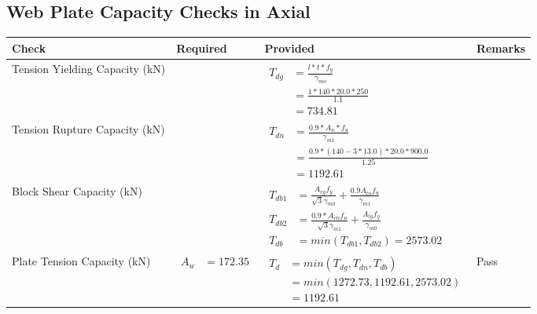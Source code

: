 \documentclass{article}%
\begin{document}
\subsection{Web Plate Capacity Checks in Axial}%
\label{subsec:WebPlateCapacityChecksinAxial}%
\renewcommand{\arraystretch}{1.2}%
\begin{longtable}{|p{4cm}|p{6cm}|p{5.5cm}|p{1.5cm}|}%
\hline%
\rowcolor{OsdagGreen}%
Check&Required&Provided&Remarks\\%
\hline%
\endhead%
\hline%
Tension Yielding Capacity (kN)&&$\begin{aligned} T_{dg} &= \frac{l*t*f_y}{\gamma_{mo}}\\ &=\frac{1*140*20.0*250}{1.1}\\ &=734.81\end{aligned}$&\\%
\hline%
Tension Rupture Capacity (kN)&&$\begin{aligned} T_{dn} &= \frac{0.9*A_{n}*f_u}{\gamma_{m1}}\\ &=\frac{0.9*(140-3*13.0)*20.0*900.0}{1.25}\\ &=1192.61\end{aligned}$&\\%
\hline%
Block Shear Capacity (kN)&&$\begin{aligned}T_{db1} &= \frac{A_{vg} f_{y}}{\sqrt{3} \gamma_{m0}} + \frac{0.9 A_{tn} f_{u}}{\gamma_{m1}}\\ T_{db2} &= \frac{0.9*A_{vn} f_{u}}{\sqrt{3} \gamma_{m1}} + \frac{A_{tg} f_{y}}{\gamma_{m0}}\\ T_{db} &= min(T_{db1}, T_{db2})= 2573.02\end{aligned}$&\\%
\hline%
Plate Tension Capacity (kN)&$\begin{aligned} A_w &=172.35\end{aligned}$&$\begin{aligned} T_d &= min(T_{dg},T_{dn},T_{db})\\ &= min(1272.73,1192.61,2573.02)\\ &=1192.61\end{aligned}$&Pass\\%
\hline%
\end{longtable}

%
\newpage%
\end{document}
